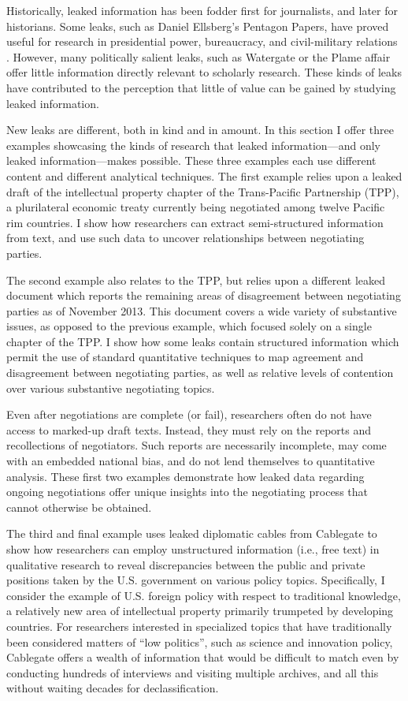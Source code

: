 \documentclass[12pt]{article}
\begin{document}
Historically, leaked information has been fodder first for journalists, and later for historians. 
Some leaks, such as Daniel Ellsberg's Pentagon Papers, have proved useful for research in 
presidential power, bureaucracy, and civil-military relations \citep{schwab2006clash,stevenson2006warriors}. However, many politically salient 
leaks, such as Watergate or the Plame affair offer little information directly relevant to scholarly research. 
These kinds of leaks have contributed to the perception that little of value can be gained by studying leaked information. 

New leaks are different, both in kind and in amount. In this section I offer three examples showcasing the kinds of research that 
leaked information---and only leaked information---makes possible. These three examples each use different content and different 
analytical techniques. The first example relies upon a leaked draft of the intellectual property 
chapter of the Trans-Pacific 
Partnership (TPP), a plurilateral economic treaty currently being negotiated among twelve Pacific rim 
countries. I show how researchers can extract semi-structured information from text, and use such data 
to uncover relationships between negotiating parties.

The second example also relates to the TPP, but relies upon a different leaked document which reports  
the remaining areas of disagreement between negotiating parties as of November 2013. This document  
covers a wide variety of substantive issues, as opposed to the previous example, which focused solely 
on a single chapter of the TPP. I show how some leaks contain structured information which 
permit the use of standard quantitative techniques to map agreement and disagreement between negotiating 
parties, as well as relative levels of contention over various substantive negotiating topics. 

Even after negotiations are complete (or fail), researchers often do not have 
access to marked-up draft texts. Instead, they must rely on the reports and recollections of negotiators.  
Such reports are necessarily incomplete, may come with an embedded national bias, and do not lend themselves 
to quantitative analysis. These first two examples demonstrate how leaked data regarding ongoing negotiations 
offer unique insights into the negotiating process that cannot otherwise be obtained. 

The third and final example uses leaked diplomatic cables from Cablegate to show how researchers can employ 
unstructured information (i.e., free text) in qualitative research to reveal discrepancies between the 
public and private positions taken by the U.S. government on various policy topics. Specifically, I consider 
the example of U.S. foreign policy with respect to traditional knowledge, a relatively new area of intellectual 
property primarily trumpeted by developing countries. For researchers interested in specialized topics 
that have traditionally been considered matters of ``low politics'', such as science and innovation policy, 
Cablegate offers a wealth of information that would be difficult to match even by conducting hundreds of 
interviews and visiting multiple archives, and all this without waiting decades for declassification.
\end{document}
